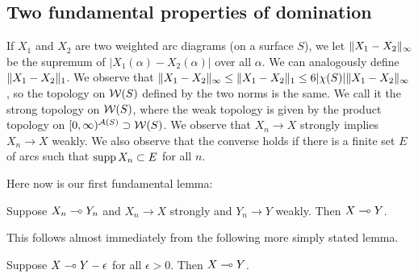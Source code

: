 \subsection{Two fundamental properties of domination}
If $X_1$ and $X_2$ are two weighted arc diagrams (on a surface $S$),
we let $\Vert X_1 - X_2 \Vert_\infty$ be the supremum of $|X_1(\alpha) - X_2(\alpha)|$ over all $\alpha$.
We can analogously define $\Vert X_1- X_2 \Vert_1$. 
We observe that $\Vert X_1 - X_2 \Vert_\infty \le \Vert X_1 - X_2 \Vert_1 \le 6|\chi(S)| \Vert X_1 - X_2 \Vert_\infty$,
so the topology on ${\mathcal W}(S)$ defined by the two norms is the same.
We call it the strong topology on ${\mathcal W}(S)$, 
where the weak topology is given by the product topology on $[0, \infty)^{{\mathcal A}(S)} \supset {\mathcal W}(S)$. 
We observe that $X_n \to X$ strongly implies $X_n \to X$ weakly.
We also observe that the converse holds if there is a finite set $E$ of arcs such that $\operatorname{supp} X_n \subset E$ for all $n$. 

Here now is our first fundamental lemma:
\begin{lemma} \label{lem:domination-closed}
Suppose $X_n \multimap Y_n$ and $X_n\to X$ strongly and $Y_n \to Y$ weakly. Then $X \multimap Y$. 
\end{lemma}

This follows almost immediately from the following more simply stated lemma.
\begin{lemma} \label{lem:y-minus-epsilon}
Suppose $X \multimap Y-\epsilon$ for all $\epsilon > 0$. Then $X \multimap Y$. 
\end{lemma}

